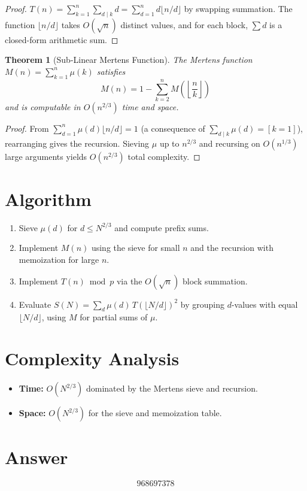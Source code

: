 \documentclass[11pt]{article}
\newtheorem{theorem}{Theorem}
\begin{document}
\begin{proof}
$T(n) = \sum_{k=1}^n \sum_{d \mid k} d = \sum_{d=1}^n d \lfloor n/d \rfloor$ by swapping summation. The function $\lfloor n/d \rfloor$ takes $O(\sqrt{n})$ distinct values, and for each block, $\sum d$ is a closed-form arithmetic sum.
\end{proof}

\begin{theorem}[Sub-Linear Mertens Function]
The Mertens function $M(n) = \sum_{k=1}^n \mu(k)$ satisfies
\[
M(n) = 1 - \sum_{k=2}^{n} M\!\left(\left\lfloor \frac{n}{k}\right\rfloor\right)
\]
and is computable in $O(n^{2/3})$ time and space.
\end{theorem}

\begin{proof}
From $\sum_{d=1}^n \mu(d)\lfloor n/d \rfloor = 1$ (a consequence of $\sum_{d \mid k} \mu(d) = [k=1]$), rearranging gives the recursion. Sieving $\mu$ up to $n^{2/3}$ and recursing on $O(n^{1/3})$ large arguments yields $O(n^{2/3})$ total complexity.
\end{proof}

\section{Algorithm}
\begin{enumerate}
    \item Sieve $\mu(d)$ for $d \leq N^{2/3}$ and compute prefix sums.
    \item Implement $M(n)$ using the sieve for small $n$ and the recursion with memoization for large $n$.
    \item Implement $T(n) \bmod p$ via the $O(\sqrt{n})$ block summation.
    \item Evaluate $S(N) = \sum_d \mu(d)\,T(\lfloor N/d \rfloor)^2$ by grouping $d$-values with equal $\lfloor N/d \rfloor$, using $M$ for partial sums of $\mu$.
\end{enumerate}

\section{Complexity Analysis}
\begin{itemize}
    \item \textbf{Time:} $O(N^{2/3})$ dominated by the Mertens sieve and recursion.
    \item \textbf{Space:} $O(N^{2/3})$ for the sieve and memoization table.
\end{itemize}

\section{Answer}

\[
\boxed{968697378}
\]
\end{document}
